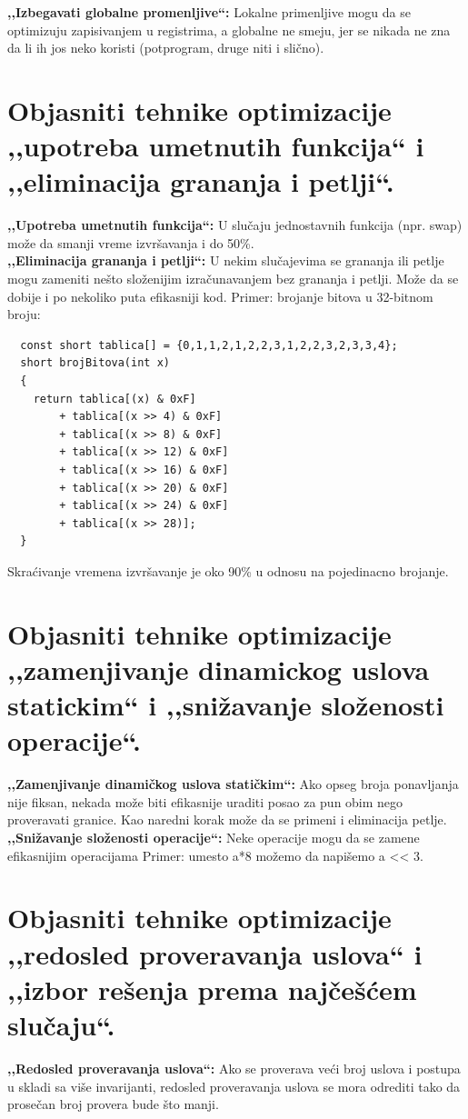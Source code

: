 \documentclass[a4paper]{article}
\begin{document}
  \textbf{,,Izbegavati globalne promenljive``:} Lokalne primenljive mogu da se optimizuju zapisivanjem 
  u registrima, a globalne ne smeju, jer se nikada ne zna da li ih jos neko koristi (potprogram, 
  druge niti i slično).
  
\section{Objasniti tehnike optimizacije ,,upotreba umetnutih funkcija`` i 
         ,,eliminacija grananja i petlji``.}
  
  \textbf{,,Upotreba umetnutih funkcija``:} U slučaju jednostavnih funkcija (npr. swap) može da smanji 
  vreme izvršavanja i do 50\%.\\
  
  \textbf{,,Eliminacija grananja i petlji``:} U nekim slučajevima se grananja ili petlje mogu 
  zameniti nešto složenijim izračunavanjem bez grananja i petlji. Može da se dobije i po nekoliko 
  puta efikasniji kod. Primer: brojanje bitova u 32-bitnom broju:
\begin{lstlisting}
  const short tablica[] = {0,1,1,2,1,2,2,3,1,2,2,3,2,3,3,4};
  short brojBitova(int x)
  {
    return tablica[(x) & 0xF]
        + tablica[(x >> 4) & 0xF]
        + tablica[(x >> 8) & 0xF]
        + tablica[(x >> 12) & 0xF]
        + tablica[(x >> 16) & 0xF]
        + tablica[(x >> 20) & 0xF]
        + tablica[(x >> 24) & 0xF]
        + tablica[(x >> 28)];
  }\end{lstlisting} 
  Skraćivanje vremena izvršavanje je oko 90\% u odnosu na pojedinacno brojanje.
  
\section{Objasniti tehnike optimizacije ,,zamenjivanje dinamickog uslova statickim`` i 
         ,,snižavanje složenosti operacije``.}
  \textbf{,,Zamenjivanje dinamičkog uslova statičkim``:} Ako opseg broja ponavljanja nije fiksan, 
  nekada može biti efikasnije uraditi posao za pun obim nego proveravati granice. 
  Kao naredni korak može da se primeni i eliminacija petlje.\\
  
  \textbf{,,Snižavanje složenosti operacije``:} Neke operacije mogu da se zamene efikasnijim operacijama 
  Primer: umesto a*8 možemo da napišemo a << 3.
  
\section{Objasniti tehnike optimizacije ,,redosled proveravanja uslova`` i 
         ,,izbor rešenja prema najčešćem slučaju``.}
  \textbf{,,Redosled proveravanja uslova``:} Ako se proverava veći broj uslova i postupa u skladi 
  sa više invarijanti, redosled proveravanja uslova se mora odrediti tako da prosečan broj 
  provera bude što manji.\\
  
\end{document}
